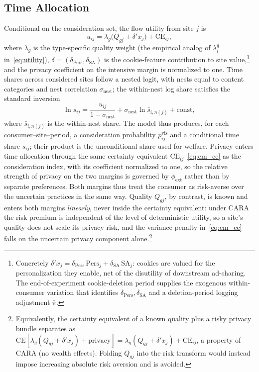 \documentclass[12pt]{article}
\theoremstyle{definition}
\newcommand{\CE}{\text{CE}}
\theoremstyle{remark}
\begin{document}
\subsection{Time Allocation}

Conditional on the consideration set, the flow utility from site $j$ is
\begin{equation}\label{eq:em_uint}
  u_{ij} = \lambda_g \bigl(Q_{gj} + \delta' x_j\bigr) + \CE_{ij},
\end{equation}
where $\lambda_g$ is the type-specific quality weight (the empirical analog of $\lambda^q_i$ in~\eqref{eq:utility}), $\delta = (\delta_{\text{Pers}}, \delta_{\text{SA}})$ is the cookie-feature contribution to site value,\footnote{Concretely $\delta' x_j = \delta_{\text{Pers}}\,\text{Pers}_j + \delta_{\text{SA}}\,\text{SA}_j$: cookies are valued for the personalization they enable, net of the disutility of downstream ad-sharing. The end-of-experiment cookie-deletion period supplies the exogenous within-consumer variation that identifies $\delta_{\text{Pers}}, \delta_{\text{SA}}$ and a deletion-period logging adjustment $\bar\pi$.} and the privacy coefficient on the intensive margin is normalized to one. Time shares across considered sites follow a nested logit, with nests equal to content categories and nest correlation $\sigma_{\text{nest}}$; the within-nest log share satisfies the standard inversion
\begin{equation}\label{eq:em_nl}
  \ln s_{ij} = \frac{u_{ij}}{1 - \sigma_{\text{nest}}} + \sigma_{\text{nest}} \ln \bar{s}_{i, n(j)} + \text{const},
\end{equation}
where $\bar{s}_{i,n(j)}$ is the within-nest share. The model thus produces, for each consumer--site--period, a consideration probability $p^{\text{vis}}_{ij}$ and a conditional time share $s_{ij}$; their product is the unconditional share used for welfare. Privacy enters time allocation through the same certainty equivalent $\CE_{ij}$~\eqref{eq:em_ce} as the consideration index, with its coefficient normalized to one, so the relative strength of privacy on the two margins is governed by $\phi_{\text{ext}}$ rather than by separate preferences. Both margins thus treat the consumer as risk-averse over the uncertain practices in the same way. Quality $Q_{gj}$, by contrast, is known and enters both margins \emph{linearly}, never inside the certainty equivalent: under CARA the risk premium is independent of the level of deterministic utility, so a site's quality does not scale its privacy risk, and the variance penalty in~\eqref{eq:em_ce} falls on the uncertain privacy component alone.\footnote{Equivalently, the certainty equivalent of a known quality plus a risky privacy bundle separates as $\CE[\lambda_g(Q_{gj}+\delta'x_j) + \text{privacy}] = \lambda_g(Q_{gj}+\delta'x_j) + \CE_{ij}$, a property of CARA (no wealth effects). Folding $Q_{gj}$ into the risk transform would instead impose increasing absolute risk aversion and is avoided.}
\end{document}
